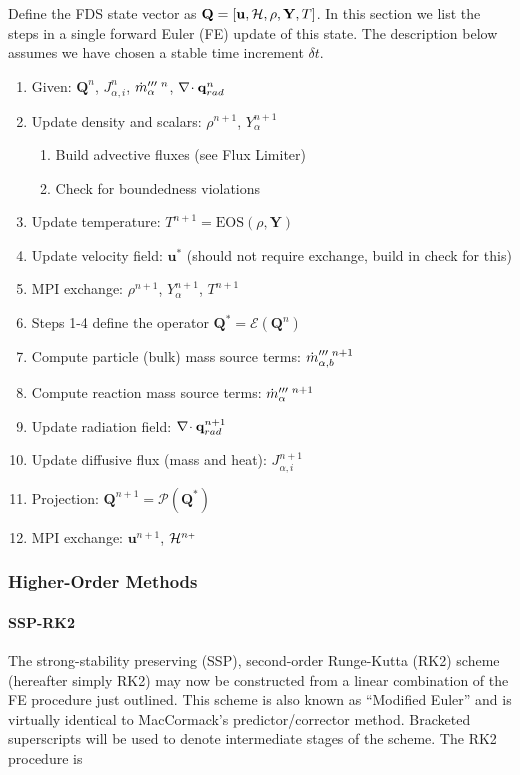 \documentclass[11pt]{article}
\begin{document}
Define the FDS state vector as $\mathbf{Q} = [\mathbf{u},{\cal H},\rho,\mathbf{Y},T]$. In this section we list the steps in a single forward Euler (FE) update of this state.  The description below assumes we have chosen a stable time increment $\delta t$.

\begin{enumerate}
\item[] Given: $\mathbf{Q}^n$, $J_{\alpha,i}^n$, $\dot{m}_\alpha^{{\prime\prime\prime} \,\,n}$, $\nabla\!\cdot \mathbf{q}_{rad}^n$
\item Update density and scalars: $\rho^{n+1}$, $Y_\alpha^{n+1}$
    \begin{enumerate}
    \item Build advective fluxes (see Flux Limiter)
    \item Check for boundedness violations
    \end{enumerate}
\item Update temperature: $T^{n+1} = \mbox{EOS}(\rho,\mathbf{Y})$
\item Update velocity field: $\mathbf{u}^*$ (should not require exchange, build in check for this)
\item MPI exchange: $\rho^{n+1}$, $Y_\alpha^{n+1}$, $T^{n+1}$
\item[] Steps 1-4 define the operator $\mathbf{Q}^{*} = \mathcal{E}(\mathbf{Q}^n)$
\item Compute particle (bulk) mass source terms: $\dot{m}_{\alpha,b}^{{\prime\prime\prime}\,\,n+1}$
\item Compute reaction mass source terms: $\dot{m}_\alpha^{{\prime\prime\prime}\,\,n+1}$
\item Update radiation field: $\nabla\!\cdot \mathbf{q}_{rad}^{n+1}$
\item Update diffusive flux (mass and heat): $J_{\alpha,i}^{n+1}$
\item Projection: $\mathbf{Q}^{n+1} = \mathcal{P}(\mathbf{Q}^*)$
\item MPI exchange: $\mathbf{u}^{n+1}$, ${\cal H}^{n{\scriptscriptstyle +}}$
\end{enumerate}


\subsubsection{Higher-Order Methods}

\paragraph{SSP-RK2}

The strong-stability preserving (SSP), second-order Runge-Kutta (RK2) scheme (hereafter simply RK2) may now be constructed from a linear combination of the FE procedure just outlined.  This scheme is also known as ``Modified Euler'' and is virtually identical to MacCormack's predictor/corrector method.  Bracketed superscripts will be used to denote intermediate stages of the scheme.  The RK2 procedure is
\end{document}

